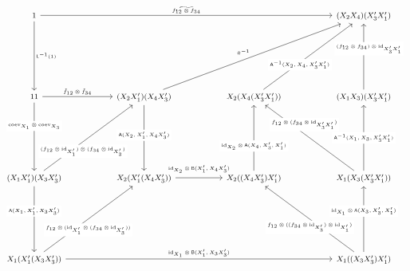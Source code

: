 \begin{prf}
\begin{enumerate}
\begin{equation*}
\begin{tikzcd}[row sep=7em,column sep=5em,font=\footnotesize,every label/.append style={font=\tiny}]
  1
  \ar{rrr}{\widetilde{f_{12} \otimes f_{34}}}
  \ar{d}{\mathsf{L}^{-1}(1)}
  &
  &
  &
  (X_{2} X_{4}) (X_{3}^{\prime} X_{1}^{\prime})
  \\
  1 1
  \ar{r}{\tilde{f}_{12} \otimes \tilde{f}_{34}}
  \ar{d}[description,yshift=4mm]{\mathrm{coev}_{X_{1}} \otimes \mathrm{coev}_{X_{3}}}
  &
  (X_{2} X_{1}^{\prime}) (X_{4} X_{3}^{\prime})
  \ar{urr}{\tilde{\pi}^{-1}}
  \ar{d}[description,yshift=1mm]{\mathsf{A}(X_{2},X_{1}^{\prime},X_{4} X_{3}^{\prime})}
  &
  X_{2} (X_{4} (X_{3}^{\prime} X_{1}^{\prime}))
  \ar{ur}[description,xshift=-3mm,yshift=-3mm]{\mathsf{A}^{-1}(X_{2},X_{4},X_{3}^{\prime} X_{1}^{\prime})}
  &
  (X_{1} X_{3}) (X_{3}^{\prime} X_{1}^{\prime})
  \ar{u}[description,xshift=2mm,yshift=3mm]{(f_{12} \otimes f_{34}) \otimes \mathrm{id}_{X_{3}^{\prime} X_{1}^{\prime}}}
  \\
  (X_{1} X_{1}^{\prime}) (X_{3} X_{3}^{\prime})
  \ar{ur}[description,xshift=-2mm,yshift=-5mm]{(f_{12} \otimes \mathrm{id}_{X_{1}^{\prime}}) \otimes (f_{34} \otimes \mathrm{id}_{X_{3}^{\prime}})}
  \ar{d}[description,yshift=3mm]{\mathsf{A}(X_{1},X_{1}^{\prime},X_{3} X_{3}^{\prime})}
  &
  X_{2} (X_{1}^{\prime} (X_{4} X_{3}^{\prime}))
  \ar{r}[yshift=3pt]{\mathrm{id}_{X_{2}} \otimes \mathsf{B}(X_{1}^{\prime},X_{4} X_{3}^{\prime})}
  &
  X_{2} ((X_{4} X_{3}^{\prime}) X_{1}^{\prime})
  \ar{u}[description,yshift=-3mm]{\mathrm{id}_{X_{2}} \otimes \mathsf{A}(X_{4},X_{3}^{\prime},X_{1}^{\prime})}
  &
  X_{1} (X_{3} (X_{3}^{\prime} X_{1}^{\prime}))
  \ar{u}[description]{\mathsf{A}^{-1}(X_{1},X_{3},X_{3}^{\prime} X_{1}^{\prime})}
  \ar{ul}[description,xshift=-2mm,yshift=5mm]{f_{12} \otimes (f_{34} \otimes \mathrm{id}_{X_{3}^{\prime} X_{1}^{\prime}})}
  \\
  X_{1} (X_{1}^{\prime} (X_{3} X_{3}^{\prime}))
  \ar{ur}[description,yshift=-4mm]{f_{12} \otimes (\mathrm{id}_{X_{1}^{\prime}} \otimes (f_{34} \otimes \mathrm{id}_{X_{3}^{\prime}}))}
  \ar{rrr}{\mathrm{id}_{X_{1}} \otimes \mathsf{B}(X_{1}^{\prime},X_{3} X_{3}^{\prime})}
  &
  &
  &
  X_{1} ((X_{3} X_{3}^{\prime}) X_{1}^{\prime})
  \ar{u}[description,yshift=3mm]{\mathrm{id}_{X_{1}} \otimes \mathsf{A}(X_{3},X_{3}^{\prime},X_{1}^{\prime})}
  \ar{ul}[description,yshift=-3mm]{f_{12} \otimes ((f_{34} \otimes \mathrm{id}_{X_{3}^{\prime}}) \otimes \mathrm{id}_{X_{1}^{\prime}})}
\end{tikzcd}
\end{equation*}

\end{enumerate}
\end{prf}
